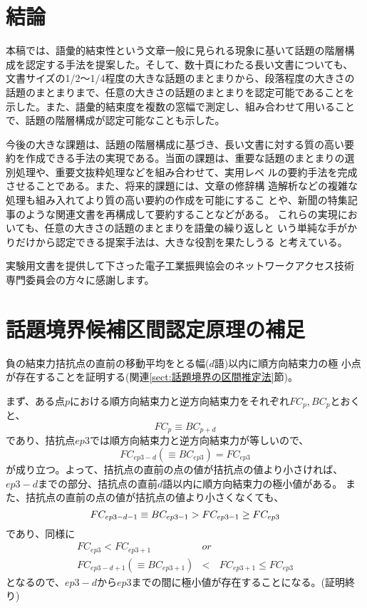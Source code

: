 \section{結論}

本稿では、語彙的結束性という文章一般に見られる現象に基いて話題の階層構
成を認定する手法を提案した。そして、数十頁にわたる長い文書についても、
文書サイズの1/2〜1/4程度の大きな話題のまとまりから、段落程度の大きさの
話題のまとまりまで、任意の大きさの話題のまとまりを認定可能であることを
示した。また、語彙的結束度を複数の窓幅で測定し、組み合わせて用いること
で、話題の階層構成が認定可能なことも示した。

今後の大きな課題は、話題の階層構成に基づき、長い文書に対する質の高い要
約を作成できる手法の実現である。当面の課題は、重要な話題のまとまりの選
別処理\cite{PNLP-4W-P72}や、重要文抜粋処理などを組み合わせて、実用レベ
ルの要約手法を完成させることである。また、将来的課題には、文章の修辞構
造解析などの複雑な処理も組み入れてより質の高い要約の作成を可能にするこ
とや、新聞の特集記事のような関連文書を再構成して要約することなどがある。
これらの実現においても、任意の大きさの話題のまとまりを語彙の繰り返しと
いう単純な手がかりだけから認定できる提案手法は、大きな役割を果たしうる
と考えている。

\acknowledgment
実験用文書を提供して下さった電子工業振興協会のネットワークアクセス技術
専門委員会の方々に感謝します。

\appendix
\section{話題境界候補区間認定原理の補足}
\label{app:拮抗点と順方向結束力の関係}

負の結束力拮抗点の直前の移動平均をとる幅($d$語)以内に順方向結束力の極
小点が存在することを証明する(関連\ref{sect:話題境界の区間推定法}節)。

まず、ある点$p$における順方向結束力と逆方向結束力をそれぞれ$FC_p,
BC_p$とおくと、
\[
   FC_p \equiv BC_{p+d}
\]
であり、拮抗点$ep3$では順方向結束力と逆方向結束力が等しいので、
\[
   FC_{ep3-d} (\equiv BC_{ep3}) = FC_{ep3} 
\]
が成り立つ。よって、拮抗点の直前の点の値が拮抗点の値より小さければ、
$ep3-d$までの部分、拮抗点の直前$d$語以内に順方向結束力の極小値がある。
また、拮抗点の直前の点の値が拮抗点の値より小さくなくても、
\[
   FC_{ep3-d-1} \equiv BC_{ep3-1} > FC_{ep3-1} \ge FC_{ep3} \\
\]
であり、同様に
\begin{eqnarray*}
    FC_{ep3} < FC_{ep3+1} &or& \\
    FC_{ep3-d+1} (\equiv BC_{ep3+1}) &<& FC_{ep3+1} \le FC_{ep3}
\end{eqnarray*}
となるので、$ep3-d$から$ep3$までの間に極小値が存在することになる。(証明終り)

